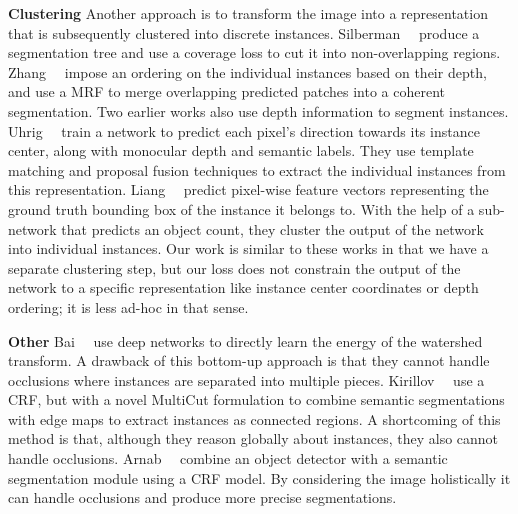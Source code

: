 \documentclass[10pt,twocolumn,letterpaper]{article}
\begin{document}
\textbf{Clustering}
Another approach is to transform the image into a representation that is subsequently clustered into discrete instances.
Silberman~\etal~\cite{silberman2014instance} produce a segmentation tree and use a coverage loss to cut it into non-overlapping regions.
Zhang~\etal~\cite{zhang2015monocular} impose an ordering on the individual instances based on their depth, and use a MRF to merge overlapping predicted patches into a coherent segmentation. Two earlier works \cite{yang2012layered, tighe2014scene} also use depth information to segment instances.
Uhrig~\etal~\cite{uhrig2016pixel} train a network to predict each pixel's direction towards its instance center, along with monocular depth and semantic labels. They use template matching and proposal fusion techniques to extract the individual instances from this representation.
Liang~\etal~\cite{liang2015proposal} predict pixel-wise feature vectors representing the ground truth bounding box of the instance it belongs to. With the help of a sub-network that predicts an object count, they cluster the output of the network into individual instances.
Our work is similar to these works in that we have a separate clustering step, but our loss does not constrain the output of the network to a specific representation like instance center coordinates or depth ordering; it is less ad-hoc in that sense.


\textbf{Other}
Bai~\etal~\cite{bai2016deep} use deep networks to directly learn the energy
of the watershed transform.
A drawback of this bottom-up approach is that they cannot handle occlusions where instances are separated into multiple pieces.   
Kirillov~\etal~\cite{kirillov2016instancecut} use a CRF, but with a novel MultiCut formulation to combine semantic segmentations with edge maps to extract instances as connected regions. A shortcoming of this method is that, although they reason globally about instances, they also cannot handle occlusions. 
Arnab~\etal~\cite{arnab2017pixelwise} combine an object detector with a semantic segmentation module using a CRF model. By considering the image holistically it can handle occlusions and produce more precise segmentations.
\end{document}
